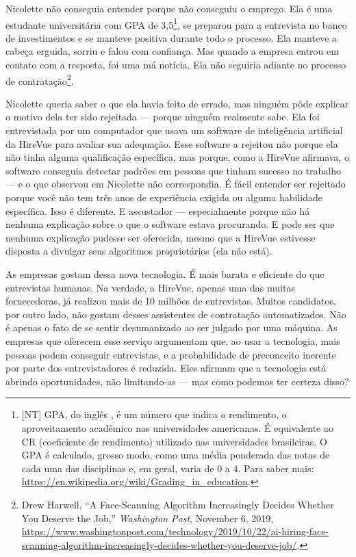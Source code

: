 Nicolette não conseguia entender porque não conseguiu o emprego. Ela é uma
estudante universitária com GPA de 3,5\footnote{[NT] GPA, do inglês
, é um número que indica o rendimento, o
aproveitamento acadêmico nas universidades americanas. É equivalente ao CR
(coeficiente de rendimento) utilizado nas universidades brasileiras. O GPA é
calculado, grosso modo, como uma média ponderada das notas de cada uma das
disciplinas e, em geral, varia de 0 a 4. Para saber mais:
\url{https://en.wikipedia.org/wiki/Grading_in_education}.}, 
se preparou para a entrevista no banco de investimentos e se manteve
positiva durante todo o processo. Ela manteve a cabeça erguida, sorriu e falou
com confiança. Mas quando a empresa entrou em contato com a resposta, foi uma má
notícia. Ela não seguiria adiante no processo de contratação\footnote{Drew
Harwell, ``A Face-Scanning Algorithm Increasingly Decides Whether You Deserve
the Job,'' \textit{Washington Post}, November 6, 2019, \url{https://www.washingtonpost.com/technology/2019/10/22/ai-hiring-face-scanning-algorithm-increasingly-decides-whether-you-deserve-job/}.}. 

 Nicolette queria saber o que
ela havia feito de errado, mas ninguém pôde 
explicar o motivo dela ter sido rejeitada --- porque ninguém realmente sabe.
Ela foi entrevistada por um computador que usava um software de inteligência
artificial da HireVue para avaliar sua adequação. Esse software a rejeitou não
porque ela não tinha alguma qualificação específica, mas porque, como a HireVue
afirmava, o software conseguia detectar padrões em pessoas que tinham sucesso no
trabalho --- e o que observou em Nicolette não correspondia. É fácil entender
ser rejeitado porque você não tem três anos de experiência exigida ou alguma
habilidade específica. Isso é diferente. E assustador --- especialmente porque
não há nenhuma explicação sobre o que o software estava procurando. E pode ser
que nenhuma explicação pudesse ser oferecida, mesmo que a HireVue estivesse
disposta a divulgar seus algoritmos proprietários (ela não está).%

As empresas gostam dessa nova tecnologia. É mais barata e eficiente do que 
entrevistas humanas. Na verdade, a HireVue, apenas uma das muitas fornecedoras, 
já realizou mais de 10 milhões de entrevistas. Muitos candidatos, por outro 
lado, não gostam desses assistentes de contratação automatizados. Não é apenas o
fato de se sentir desumanizado ao ser julgado por uma máquina. As empresas que 
oferecem esse serviço argumentam que, ao usar a tecnologia, mais pessoas podem 
conseguir entrevistas, e a probabilidade de preconceito inerente por parte dos
entrevistadores é reduzida. Eles afirmam que a tecnologia está abrindo
oportunidades, não limitando-as --- mas como podemos ter certeza disso?

